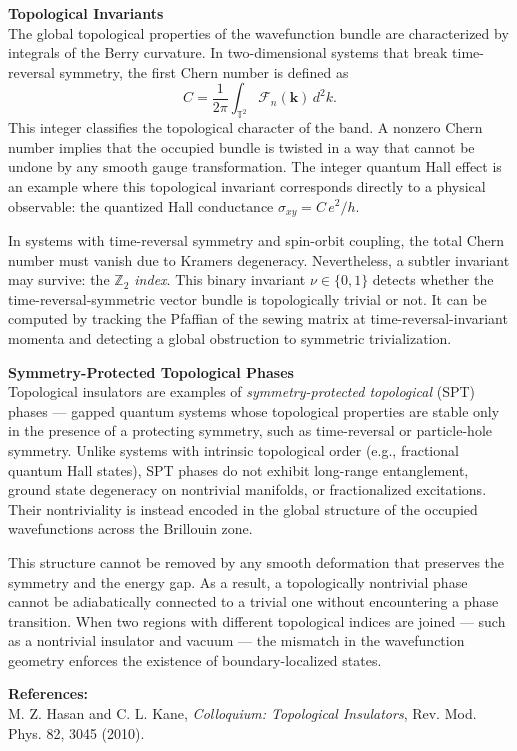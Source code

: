 \begin{technical}
\textbf{Topological Invariants}\\[0.5em]
The global topological properties of the wavefunction bundle are characterized by integrals of the Berry curvature. In two-dimensional systems that break time-reversal symmetry, the first Chern number is defined as
\[
C = \frac{1}{2\pi} \int_{\mathbb{T}^2} \mathcal{F}_n(\mathbf{k}) \, d^2k.
\]
This integer classifies the topological character of the band. A nonzero Chern number implies that the occupied bundle is twisted in a way that cannot be undone by any smooth gauge transformation. The integer quantum Hall effect is an example where this topological invariant corresponds directly to a physical observable: the quantized Hall conductance \( \sigma_{xy} = C \, e^2/h \).

In systems with time-reversal symmetry and spin-orbit coupling, the total Chern number must vanish due to Kramers degeneracy. Nevertheless, a subtler invariant may survive: the \emph{\( \mathbb{Z}_2 \) index}. This binary invariant \(\nu \in \{0,1\}\) detects whether the time-reversal-symmetric vector bundle is topologically trivial or not. It can be computed by tracking the Pfaffian of the sewing matrix at time-reversal-invariant momenta and detecting a global obstruction to symmetric trivialization.

\textbf{Symmetry-Protected Topological Phases}\\[0.5em]
Topological insulators are examples of \emph{symmetry-protected topological} (SPT) phases — gapped quantum systems whose topological properties are stable only in the presence of a protecting symmetry, such as time-reversal or particle-hole symmetry. Unlike systems with intrinsic topological order (e.g., fractional quantum Hall states), SPT phases do not exhibit long-range entanglement, ground state degeneracy on nontrivial manifolds, or fractionalized excitations. Their nontriviality is instead encoded in the global structure of the occupied wavefunctions across the Brillouin zone.

This structure cannot be removed by any smooth deformation that preserves the symmetry and the energy gap. As a result, a topologically nontrivial phase cannot be adiabatically connected to a trivial one without encountering a phase transition. When two regions with different topological indices are joined — such as a nontrivial insulator and vacuum — the mismatch in the wavefunction geometry enforces the existence of boundary-localized states.

\vspace{0.5em}
\textbf{References:}\\
M. Z. Hasan and C. L. Kane, \textit{Colloquium: Topological Insulators}, Rev. Mod. Phys. 82, 3045 (2010).
\end{technical}
